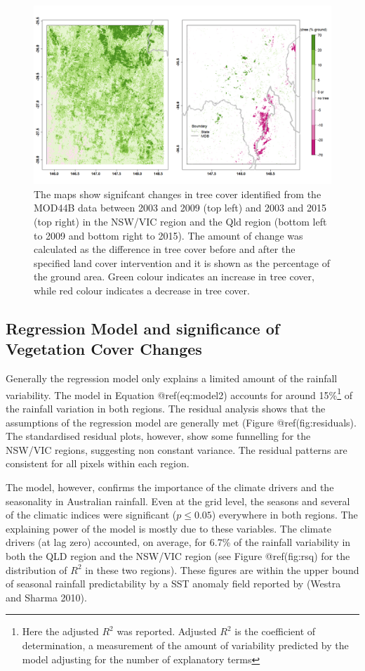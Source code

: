\documentclass[fleqn,10pt,lineno]{wlpeerj} %
\begin{document}
\begin{figure}
\includegraphics[width=0.9\linewidth]{figures/tc_figs} \caption{The maps show signifcant changes in tree cover identified from the MOD44B data between 2003 and 2009 (top left) and 2003 and 2015 (top right) in the NSW/VIC region and the Qld region (bottom left to 2009 and bottom right to 2015). The amount of change was calculated as the difference in tree cover before and after the specified land cover intervention and it is shown as the percentage of the ground area. Green colour indicates an increase in tree cover, while red colour indicates a decrease in tree cover.}\label{fig:tctrend}
\end{figure}

\subsection{Regression Model and significance of Vegetation Cover
Changes}\label{regression-model-and-significance-of-vegetation-cover-changes}

Generally the regression model only explains a limited amount of the
rainfall variability. The model in Equation @ref(eq:model2) accounts for
around
15\%\footnote{Here the adjusted $R^2$ was reported. Adjusted $R^2$ is the coefficient of determination, a measurement of the amount of variability predicted by the model adjusting for the number of explanatory terms}
of the rainfall variation in both regions. The residual analysis shows
that the assumptions of the regression model are generally met (Figure
@ref(fig:residuals). The standardised residual plots, however, show some
funnelling for the NSW/VIC regions, suggesting non constant variance.
The residual patterns are consistent for all pixels within each region.

The model, however, confirms the importance of the climate drivers and
the seasonality in Australian rainfall. Even at the grid level, the
seasons and several of the climatic indices were significant
(\(p \leq 0.05\)) everywhere in both regions. The explaining power of
the model is mostly due to these variables. The climate drivers (at lag
zero) accounted, on average, for 6.7\% of the rainfall variability in
both the QLD region and the NSW/VIC region (see Figure @ref(fig:rsq) for
the distribution of \(R^2\) in these two regions). These figures are
within the upper bound of seasonal rainfall predictability by a SST
anomaly field reported by (Westra and Sharma 2010).
\end{document}
